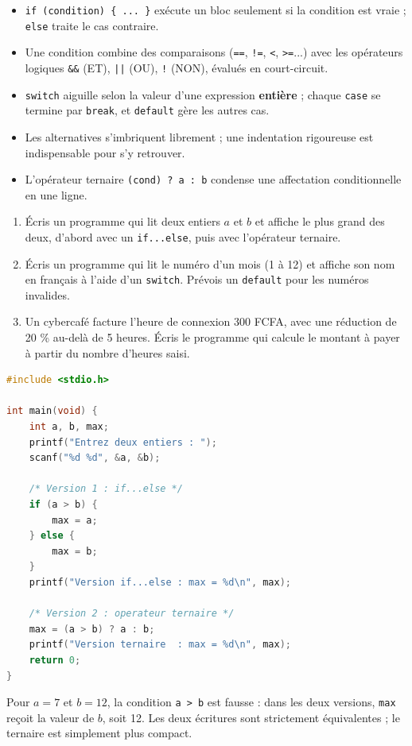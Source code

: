 \documentclass[11pt]{article}
\begin{document}
\begin{aretenir}
\begin{itemize}
    \item \texttt{if (condition) \{ ... \}} exécute un bloc seulement si la condition est vraie ; \texttt{else} traite le cas contraire.
    \item Une condition combine des comparaisons (\texttt{==}, \texttt{!=}, \texttt{<}, \texttt{>=}...) avec les opérateurs logiques \texttt{\&\&} (ET), \texttt{||} (OU), \texttt{!} (NON), évalués en court-circuit.
    \item \texttt{switch} aiguille selon la valeur d'une expression \textbf{entière} ; chaque \texttt{case} se termine par \texttt{break}, et \texttt{default} gère les autres cas.
    \item Les alternatives s'imbriquent librement ; une indentation rigoureuse est indispensable pour s'y retrouver.
    \item L'opérateur ternaire \texttt{(cond) ? a : b} condense une affectation conditionnelle en une ligne.
\end{itemize}
\end{aretenir}

\begin{exercice}
\begin{enumerate}
    \item Écris un programme qui lit deux entiers $a$ et $b$ et affiche le plus grand des deux, d'abord avec un \texttt{if...else}, puis avec l'opérateur ternaire.
    \item Écris un programme qui lit le numéro d'un mois (1 à 12) et affiche son nom en français à l'aide d'un \texttt{switch}. Prévois un \texttt{default} pour les numéros invalides.
    \item Un cybercafé facture l'heure de connexion 300 FCFA, avec une réduction de 20 \% au-delà de 5 heures. Écris le programme qui calcule le montant à payer à partir du nombre d'heures saisi.
\end{enumerate}
\end{exercice}

\begin{corrige}[Exercice 1]
\begin{lstlisting}[language=C]
#include <stdio.h>

int main(void) {
    int a, b, max;
    printf("Entrez deux entiers : ");
    scanf("%d %d", &a, &b);

    /* Version 1 : if...else */
    if (a > b) {
        max = a;
    } else {
        max = b;
    }
    printf("Version if...else : max = %d\n", max);

    /* Version 2 : operateur ternaire */
    max = (a > b) ? a : b;
    printf("Version ternaire  : max = %d\n", max);
    return 0;
}
\end{lstlisting}
Pour $a = 7$ et $b = 12$, la condition \texttt{a > b} est fausse : dans les deux versions, \texttt{max} reçoit la valeur de $b$, soit 12. Les deux écritures sont strictement équivalentes ; le ternaire est simplement plus compact.
\end{corrige}
\end{document}
